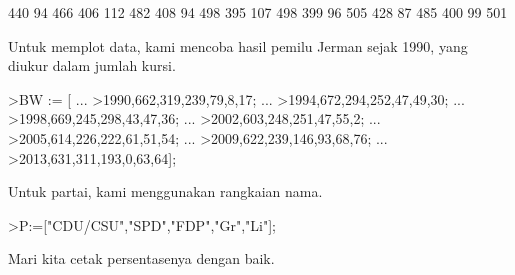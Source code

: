 \documentclass[a4paper,10pt]{article}
\begin{document}
\begin{eulernotebook}
\begin{eulercomment}
\begin{eulercomment}
\begin{eulercomment}
\begin{eulercomment}
\begin{eulercomment}
\begin{eulercomment}
\begin{eulercomment}
\begin{eulercomment}
\begin{eulercomment}
\begin{eulercomment}
\begin{eulercomment}
\begin{eulercomment}
\begin{eulercomment}
\begin{eulercomment}
\begin{eulercomment}
\begin{eulercomment}
\begin{eulercomment}
\begin{eulercomment}
\begin{euleroutput}
            440            94           466 
            406           112           482 
            408            94           498 
            395           107           498 
            399            96           505 
            428            87           485 
            400            99           501 
\end{euleroutput}
\begin{eulercomment}
Untuk memplot data, kami mencoba hasil pemilu Jerman sejak 1990, yang
diukur dalam jumlah kursi.
\end{eulercomment}
\begin{eulerprompt}
>BW := [ ...
>1990,662,319,239,79,8,17; ...
>1994,672,294,252,47,49,30; ...
>1998,669,245,298,43,47,36; ...
>2002,603,248,251,47,55,2; ...
>2005,614,226,222,61,51,54; ...
>2009,622,239,146,93,68,76; ...
>2013,631,311,193,0,63,64];
\end{eulerprompt}
\begin{eulercomment}
Untuk partai, kami menggunakan rangkaian nama.
\end{eulercomment}
\begin{eulerprompt}
>P:=["CDU/CSU","SPD","FDP","Gr","Li"];
\end{eulerprompt}
\begin{eulercomment}
Mari kita cetak persentasenya dengan baik.


\end{eulercomment}
\end{eulercomment}
\end{eulercomment}
\end{eulercomment}
\end{eulercomment}
\end{eulercomment}
\end{eulercomment}
\end{eulercomment}
\end{eulercomment}
\end{eulercomment}
\end{eulercomment}
\end{eulercomment}
\end{eulercomment}
\end{eulercomment}
\end{eulercomment}
\end{eulercomment}
\end{eulercomment}
\end{eulercomment}
\end{eulercomment}
\end{eulernotebook}
\end{document}
